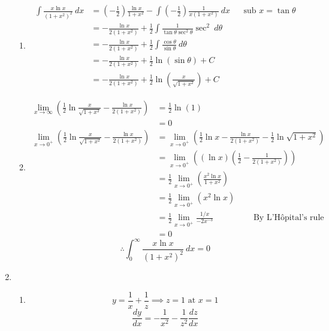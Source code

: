 \documentclass[12pt]{article}
\theoremstyle{definition}
\begin{document}
\begin{enumerate}
\begin{enumerate}[label=(\roman*)]
           \item \begin{align*}
                   \int \frac{x\ln x}{(1+x^2)^2}\ dx &= \left(-\frac{1}{2}\right)\frac{\ln x}{1+x^2} - \int\left(-\frac{1}{2}\right)\frac{1}{x(1+x^2)}\ dx && \text{sub }x=\tan\theta\\
                     &= -\frac{\ln x}{2(1+x^2)} + \frac{1}{2}\int\frac{1}{\tan\theta\sec^2\theta}\sec^2\ d\theta \\
                     &= -\frac{\ln x}{2(1+x^2)} + \frac{1}{2}\int\frac{\cos\theta}{\sin\theta}\ d\theta \\
                     &= -\frac{\ln x}{2(1+x^2)} + \frac{1}{2}\ln(\sin\theta)+C \\
                     &= -\frac{\ln x}{2(1+x^2)} + \frac{1}{2}\ln\left(\frac{x}{\sqrt{1+x^2}}\right)+C
                 \end{align*}
           \item \begin{align*}
                   \lim_{x\to \infty}\left(\frac{1}{2}\ln\frac{x}{\sqrt{1+x^2}}-\frac{\ln x}{2(1+x^2)} \right) &= \frac{1}{2}\ln(1) \\
                     &= 0 \\
                   \lim_{x\to 0^+}\left(\frac{1}{2}\ln\frac{x}{\sqrt{1+x^2}}-\frac{\ln x}{2(1+x^2)} \right) &= \lim_{x\to 0^+} \left(\frac{1}{2}\ln x - \frac{\ln x}{2(1+x^2)} - \frac{1}{2}\ln\sqrt{1+x^2} \right) \\
                     &= \lim_{x\to 0^+}\left((\ln x)\left(\frac{1}{2} - \frac{1}{2(1+x^2)}\right) \right) \\
                     &= \frac{1}{2} \lim_{x\to 0^+}\left(\frac{x^2\ln x}{1+x^2}\right) \\
                     &= \frac{1}{2} \lim_{x\to 0^+}(x^2\ln x) \\
                     &= \frac{1}{2} \lim_{x\to 0^+} \frac{1/x}{-2x^{-3}} \hspace{2cm}\text{By L'Hôpital's rule} \\
                     &= 0
                 \end{align*}
                 \[\therefore \int_0^\infty \frac{x\ln x}{(1+x^2)^2}\ dx=0\]
         \end{enumerate}
  \item \begin{enumerate}[label=(\alph*)]
          \item \[y=\frac{1}{x}+\frac{1}{z}\implies z=1\text{ at }x=1\]
                \[\frac{dy}{dx} = -\frac{1}{x^2} - \frac{1}{z^2}\frac{dz}{dx}\]

\end{enumerate}
\end{enumerate}
\end{document}
